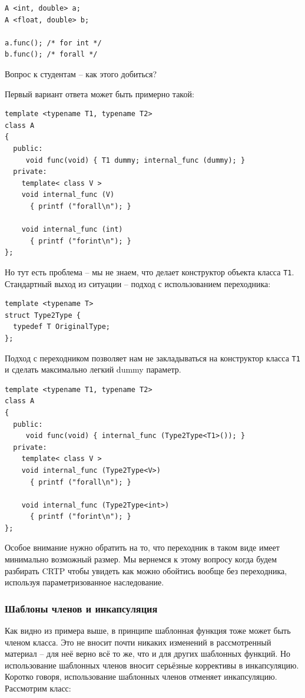 \documentclass[a4paper,12pt,oneside]{article}
\begin{document}
\begin{lstlisting}
A <int, double> a;
A <float, double> b;

a.func(); /* for int */
b.func(); /* forall */
\end{lstlisting}

Вопрос к студентам -- как этого добиться?

Первый вариант ответа может быть примерно такой:

\begin{lstlisting}
template <typename T1, typename T2>
class A
{
  public:
     void func(void) { T1 dummy; internal_func (dummy); }
  private:
    template< class V >
    void internal_func (V)
      { printf ("forall\n"); }

    void internal_func (int)
      { printf ("forint\n"); }
};
\end{lstlisting}

Но тут есть проблема -- мы не знаем, что делает конструктор объекта класса \lstinline!T1!. Стандартный выход из ситуации -- подход с использованием переходника: 

\begin{lstlisting}
template <typename T>
struct Type2Type {
  typedef T OriginalType;
};
\end{lstlisting}

Подход с переходником позволяет нам не закладываться на конструктор класса \lstinline!T1! и сделать максимально легкий dummy параметр.

\begin{lstlisting}
template <typename T1, typename T2>
class A
{
  public:
     void func(void) { internal_func (Type2Type<T1>()); }
  private:
    template< class V >
    void internal_func (Type2Type<V>)
      { printf ("forall\n"); }

    void internal_func (Type2Type<int>)
      { printf ("forint\n"); }
};
\end{lstlisting}

Особое внимание нужно обратить на то, что переходник в таком виде имеет минимально возможный размер. Мы вернемся к этому вопросу когда будем разбирать CRTP чтобы увидеть как можно обойтись вообще без переходника, используя параметризованное наследование.

\subsubsection{Шаблоны членов и инкапсуляция}

Как видно из примера выше, в принципе шаблонная функция тоже может быть членом класса. Это не вносит почти никаких изменений в рассмотренный материал -- для неё верно всё то же, что и для других шаблонных функций. Но использование шаблонных членов вносит серьёзные коррективы в инкапсуляцию. Коротко говоря, использование шаблонных членов отменяет инкапсуляцию. Рассмотрим класс:
\end{document}

